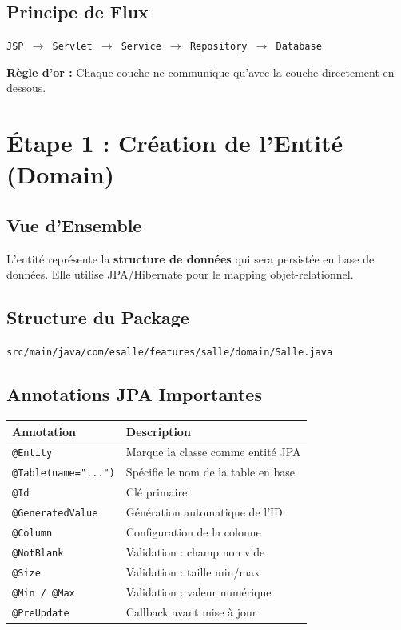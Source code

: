 \documentclass[12pt,a4paper]{article}
\begin{document}
\subsection{Principe de Flux}

\begin{center}
\texttt{JSP $\rightarrow$ Servlet $\rightarrow$ Service $\rightarrow$ Repository $\rightarrow$ Database}
\end{center}

\textbf{Règle d'or :} Chaque couche ne communique qu'avec la couche directement en dessous.

\newpage

\section{Étape 1 : Création de l'Entité (Domain)}

\subsection{Vue d'Ensemble}

L'entité représente la \textbf{structure de données} qui sera persistée en base de données. Elle utilise JPA/Hibernate pour le mapping objet-relationnel.

\subsection{Structure du Package}

\begin{tcolorbox}[colback=gray!10]
\texttt{src/main/java/com/esalle/features/salle/domain/Salle.java}
\end{tcolorbox}

\subsection{Annotations JPA Importantes}

\begin{center}
\begin{tabular}{|l|p{10cm}|}
\hline
\textbf{Annotation} & \textbf{Description} \\
\hline
\texttt{@Entity} & Marque la classe comme entité JPA \\
\hline
\texttt{@Table(name="...")} & Spécifie le nom de la table en base \\
\hline
\texttt{@Id} & Clé primaire \\
\hline
\texttt{@GeneratedValue} & Génération automatique de l'ID \\
\hline
\texttt{@Column} & Configuration de la colonne \\
\hline
\texttt{@NotBlank} & Validation : champ non vide \\
\hline
\texttt{@Size} & Validation : taille min/max \\
\hline
\texttt{@Min / @Max} & Validation : valeur numérique \\
\hline
\texttt{@PreUpdate} & Callback avant mise à jour \\
\hline
\end{tabular}
\end{center}
\end{document}
